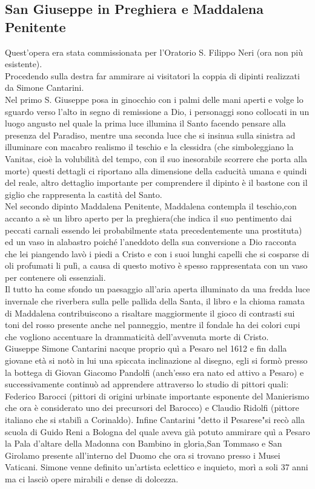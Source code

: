 \documentclass[hidelinks,12pt,a4paper]{article}
\begin{document}
\begin{flushleft}
			\subsection{San Giuseppe in Preghiera e Maddalena Penitente}
			Quest'opera era stata commissionata per l'Oratorio S. Filippo Neri (ora non più esistente).\\
			Procedendo sulla destra far ammirare ai visitatori la coppia di dipinti realizzati da Simone Cantarini.\\
			Nel primo S. Giuseppe posa in ginocchio con i palmi delle mani aperti e volge lo sguardo verso l'alto in segno di remissione a Dio, i personaggi sono collocati in un luogo angusto nel quale la prima luce illumina il Santo facendo pensare alla presenza del Paradiso, mentre una seconda luce che si insinua sulla sinistra ad illuminare con macabro realismo il teschio e la clessidra (che simboleggiano la Vanitas, cioè la volubilità del tempo, con il suo inesorabile scorrere che porta alla morte) questi dettagli ci riportano alla dimensione della caducità umana e quindi del reale, altro dettaglio importante per comprendere il dipinto è il bastone con il giglio che rappresenta la castità del Santo.\\
			Nel secondo dipinto Maddalena Penitente, Maddalena contempla il teschio,con accanto a sè un libro aperto per la preghiera(che indica il suo pentimento dai peccati carnali essendo lei probabilmente stata precedentemente una prostituta) ed un vaso in alabastro poiché l'aneddoto della sua conversione a Dio racconta che lei piangendo lavò i piedi a Cristo e con i suoi lunghi capelli che si cosparse di oli profumati li pulì, a causa di questo motivo è spesso rappresentata con un vaso per contenere oli essenziali.\\
			Il tutto ha come sfondo un paesaggio all'aria aperta illuminato da una fredda luce invernale che riverbera sulla pelle pallida della Santa, il libro e la chioma ramata di Maddalena contribuiscono a risaltare maggiormente il gioco di contrasti sui toni del rosso presente anche nel panneggio, mentre il fondale ha dei colori cupi che vogliono accentuare la drammaticità dell'avvenuta morte di Cristo.\\
			Giuseppe Simone Cantarini nacque proprio quì a Pesaro nel 1612 e fin dalla giovane età si notò in lui una spiccata inclinazione al disegno, egli si formò presso la bottega di Giovan Giacomo Pandolfi (anch'esso era nato ed attivo a Pesaro) e successivamente continuò ad apprendere attraverso lo studio di pittori quali: Federico Barocci (pittori di origini urbinate importante esponente del Manierismo che ora è considerato uno dei precursori del Barocco) e Claudio Ridolfi (pittore italiano che si stabilì a Corinaldo). Infine Cantarini "detto il Pesarese"si recò alla scuola di Guido Reni a Bologna del quale aveva già potuto ammirare quì a Pesaro la Pala d'altare della Madonna con Bambino in gloria,San Tommaso e San Girolamo presente all'interno del Duomo che ora si trovano presso i Musei Vaticani. Simone venne definito un'artista eclettico e inquieto, morì a soli 37 anni ma ci lasciò opere mirabili e dense di dolcezza.\\

\end{flushleft}
\end{document}
